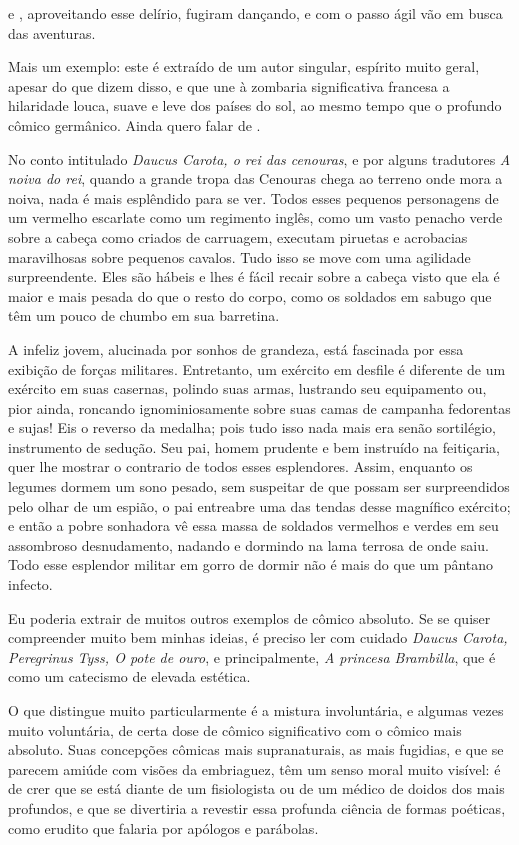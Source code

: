  e , aproveitando esse delírio, fugiram dançando, e com
o passo ágil vão em busca das aventuras.

Mais um exemplo: este é extraído de um autor singular, espírito muito
geral, apesar do que dizem disso, e que une à zombaria significativa
francesa a hilaridade louca, suave e leve dos países do sol, ao mesmo
tempo que o profundo cômico germânico. Ainda quero falar de .

No conto intitulado \textit{Daucus Carota, o rei das cenouras}, e por
alguns tradutores \textit{A noiva do rei}, quando a grande tropa das
Cenouras chega ao terreno onde mora a noiva, nada é mais esplêndido
para se ver. Todos esses pequenos personagens de um vermelho escarlate
como um regimento inglês, como um vasto penacho verde sobre a cabeça
como criados de carruagem, executam piruetas e acrobacias maravilhosas
sobre pequenos cavalos. Tudo isso se move com uma agilidade
surpreendente. Eles são hábeis e lhes é fácil recair sobre a cabeça
visto que ela é maior e mais pesada do que o resto do corpo, como os
soldados em sabugo que têm um pouco de chumbo em sua barretina.

A infeliz jovem, alucinada por sonhos de grandeza, está fascinada por
essa exibição de forças militares. Entretanto, um exército em desfile é
diferente de um exército em suas casernas, polindo suas armas,
lustrando seu equipamento ou, pior ainda, roncando ignominiosamente
sobre suas camas de campanha fedorentas e sujas! Eis o reverso da
medalha; pois tudo isso nada mais era senão sortilégio, instrumento de
sedução. Seu pai, homem prudente e bem instruído na feitiçaria, quer
lhe mostrar o contrario de todos esses esplendores. Assim, enquanto os
legumes dormem um sono pesado, sem suspeitar de que possam ser
surpreendidos pelo olhar de um espião, o pai entreabre uma das tendas
desse magnífico exército; e então a pobre sonhadora vê essa massa de
soldados vermelhos e verdes em seu assombroso desnudamento, nadando e
dormindo na lama terrosa de onde saiu. Todo esse esplendor militar em
gorro de dormir não é mais do que um pântano infecto.

Eu poderia extrair de  muitos outros exemplos de cômico
absoluto. Se se quiser compreender muito bem minhas ideias, é preciso
ler com cuidado \textit{Daucus Carota, Peregrinus Tyss, O pote de
ouro}, e principalmente, \textit{A princesa Brambilla}, que é como um
catecismo de elevada estética.

O que distingue muito particularmente  é a mistura involuntária,
e algumas vezes muito voluntária, de certa dose de cômico
significativo com o cômico mais absoluto. Suas concepções cômicas mais
supranaturais, as mais fugidias, e que se parecem amiúde com visões da
embriaguez, têm um senso moral muito visível: é de crer que se está
diante de um fisiologista ou de um médico de doidos dos mais profundos,
e que se divertiria a revestir essa profunda ciência de formas
poéticas, como erudito que falaria por apólogos e parábolas.

